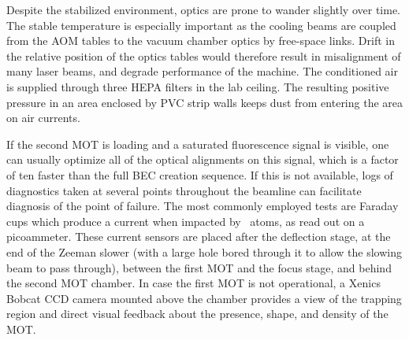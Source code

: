	Despite the stabilized environment, optics are prone to wander slightly over time.
	The stable temperature is especially important as the cooling beams are coupled from the AOM tables to the vacuum chamber optics by free-space links.
	Drift in the relative position of the optics tables would therefore result in misalignment of many laser beams, and degrade performance of the machine.
	The conditioned air is supplied through three HEPA filters in the lab ceiling.
	The resulting positive pressure in an area enclosed by PVC strip walls keeps dust from entering the area on air currents.
	

	If the second MOT is loading and a saturated fluorescence signal is visible, one can usually optimize all of the optical alignments on this signal, which is a factor of ten faster than the full BEC creation sequence.
	If this is not available, logs of diagnostics taken at several points throughout the beamline can facilitate diagnosis of the point of failure.
	The most commonly employed tests are Faraday cups which produce a current when impacted by \mhe~atoms, as read out on a picoammeter.
	These current sensors are placed after the deflection stage, at the end of the Zeeman slower (with a large hole bored through it to allow the slowing beam to pass through), between the first MOT and the focus stage, and behind the second MOT chamber.
	In case the first MOT is not operational, a Xenics Bobcat CCD camera mounted above the chamber provides a view of the trapping region and direct visual feedback about the presence, shape, and density of the MOT.
	



